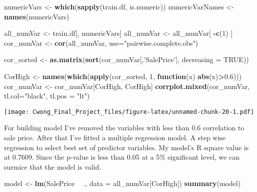 \documentclass[]{article}
\newenvironment{Shaded}{\begin{snugshade}}{\end{snugshade}}
\newcommand{\KeywordTok}[1]{\textcolor[rgb]{0.13,0.29,0.53}{\textbf{#1}}}
\newcommand{\DataTypeTok}[1]{\textcolor[rgb]{0.13,0.29,0.53}{#1}}
\newcommand{\DecValTok}[1]{\textcolor[rgb]{0.00,0.00,0.81}{#1}}
\newcommand{\FloatTok}[1]{\textcolor[rgb]{0.00,0.00,0.81}{#1}}
\newcommand{\StringTok}[1]{\textcolor[rgb]{0.31,0.60,0.02}{#1}}
\newcommand{\OtherTok}[1]{\textcolor[rgb]{0.56,0.35,0.01}{#1}}
\newcommand{\ControlFlowTok}[1]{\textcolor[rgb]{0.13,0.29,0.53}{\textbf{#1}}}
\newcommand{\OperatorTok}[1]{\textcolor[rgb]{0.81,0.36,0.00}{\textbf{#1}}}
\newcommand{\NormalTok}[1]{#1}
\begin{document}
\begin{Shaded}
\begin{Highlighting}[]
\NormalTok{numericVars <-}\StringTok{ }\KeywordTok{which}\NormalTok{(}\KeywordTok{sapply}\NormalTok{(train.df, is.numeric)) }
\NormalTok{numericVarNames <-}\StringTok{ }\KeywordTok{names}\NormalTok{(numericVars) }

\NormalTok{all_numVar <-}\StringTok{ }\NormalTok{train.df[, numericVars] }
\NormalTok{all_numVar <-}\StringTok{ }\NormalTok{all_numVar[ }\OperatorTok{-}\KeywordTok{c}\NormalTok{(}\DecValTok{1}\NormalTok{) ]}
\NormalTok{cor_numVar <-}\StringTok{ }\KeywordTok{cor}\NormalTok{(all_numVar, }\DataTypeTok{use=}\StringTok{"pairwise.complete.obs"}\NormalTok{) }

\NormalTok{cor_sorted <-}\StringTok{ }\KeywordTok{as.matrix}\NormalTok{(}\KeywordTok{sort}\NormalTok{(cor_numVar[,}\StringTok{'SalePrice'}\NormalTok{], }\DataTypeTok{decreasing =} \OtherTok{TRUE}\NormalTok{))}
 
\NormalTok{CorHigh <-}\StringTok{ }\KeywordTok{names}\NormalTok{(}\KeywordTok{which}\NormalTok{(}\KeywordTok{apply}\NormalTok{(cor_sorted, }\DecValTok{1}\NormalTok{, }\ControlFlowTok{function}\NormalTok{(x) }\KeywordTok{abs}\NormalTok{(x)}\OperatorTok{>}\FloatTok{0.6}\NormalTok{)))}
\NormalTok{cor_numVar <-}\StringTok{ }\NormalTok{cor_numVar[CorHigh, CorHigh]}
\KeywordTok{corrplot.mixed}\NormalTok{(cor_numVar, }\DataTypeTok{tl.col=}\StringTok{"black"}\NormalTok{, }\DataTypeTok{tl.pos =} \StringTok{"lt"}\NormalTok{)}
\end{Highlighting}
\end{Shaded}

\texttt{[image: Cwong\_Final\_Project\_files/figure-latex/unnamed-chunk-20-1.pdf]}

For building model I've removed the variables with less than 0.6
correlation to sale price. After that I've fitted a multiple regression
model. A step wise regression to select best set of predictor variables.
My model's R square value is at 0.7609. Since the p-value is less than
0.05 at a 5\% significant level, we can surmice that the model is valid.

\begin{Shaded}
\begin{Highlighting}[]
\NormalTok{model <-}\StringTok{ }\KeywordTok{lm}\NormalTok{(SalePrice }\OperatorTok{~}\StringTok{ }\NormalTok{., }\DataTypeTok{data =}\NormalTok{ all_numVar[CorHigh])}
\KeywordTok{summary}\NormalTok{(model)}
\end{Highlighting}
\end{Shaded}
\end{document}
